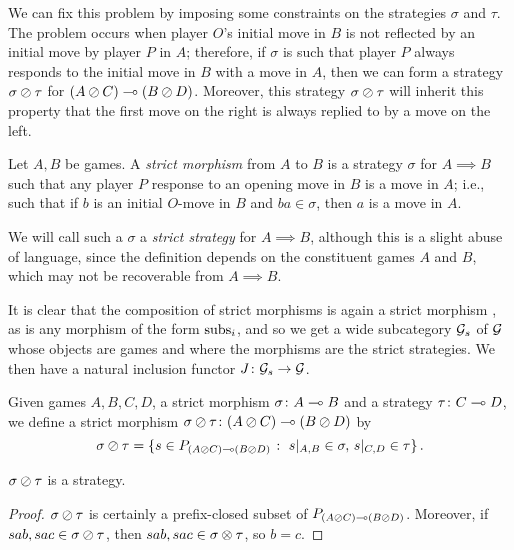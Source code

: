 \documentclass[11pt]{report}
\begin{document}
We can fix this problem by imposing some constraints on the strategies $\sigma$ and $\tau$.  
The problem occurs when player $O$'s initial move in $B$ is not reflected by an initial move by player $P$ in $A$; therefore, if $\sigma$ is such that player $P$ always responds to the initial move in $B$ with a move in $A$, then we can form a strategy $\sigma\oslash\tau$ for $(A\oslash C)\multimap (B\oslash D)$.  
Moreover, this strategy $\sigma\oslash\tau$ will inherit this property that the first move on the right is always replied to by a move on the left.

\begin{definition}
  Let $A,B$ be games.  
  A \emph{strict morphism} from $A$ to $B$ is a strategy $\sigma$ for $A\implies B$ such that any player $P$ response to an opening move in $B$ is a move in $A$; i.e., such that if $b$ is an initial $O$-move in $B$ and $ba\in\sigma$, then $a$ is a move in $A$.
\end{definition}

We will call such a $\sigma$ a \emph{strict strategy} for $A\implies B$, although this is a slight abuse of language, since the definition depends on the constituent games $A$ and $B$, which may not be recoverable from $A\implies B$.

It is clear that the composition of strict morphisms is again a strict morphism , as is any morphism of the form $\operatorname{subs}_i$, and so we get a wide subcategory $\mathcal G_s$ of $\mathcal G$ whose objects are games and where the morphisms are the strict strategies.
We then have a natural inclusion functor $J\colon \mathcal G_s\to \mathcal G$.  

\begin{definition}
  Given games $A,B,C,D$, a strict morphism $\sigma\colon A \multimap B$ and a strategy $\tau\colon C\multimap D$, we define a strict morphism $\sigma\oslash\tau\colon (A \oslash C)\multimap (B \oslash D)$ by
  \[
    \sigma\oslash\tau = \{s\in P_{(A\oslash C)\multimap (B\oslash D)}\;\colon\; s\vert_{A,B}\in\sigma,\,s\vert_{C,D}\in\tau\}\,.
    \]
  \label{DefSequoidOfStrategies}
\end{definition}

\begin{proposition}
  $\sigma\oslash\tau$ is a strategy.  
\end{proposition}
\begin{proof}
  $\sigma\oslash\tau$ is certainly a prefix-closed subset of $P_{(A\oslash C)\multimap (B\oslash D)}$.  
  Moreover, if $sab,sac\in\sigma\oslash\tau$, then $sab,sac\in\sigma\otimes\tau$, so $b=c$.  
\end{proof}
\end{document}
